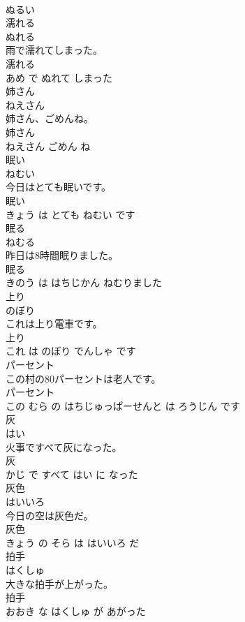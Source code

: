 \documentclass[8pt]{extreport}
\begin{document}
\begin{CJK}{UTF8}{min}
\\	ぬるい	
\\	濡れる	
\\	ぬれる			
\\	雨で濡れてしまった。	
\\	濡れる 
\\	あめ で ぬれて しまった			
\\	姉さん	
\\	ねえさん			
\\	姉さん、ごめんね。	
\\	姉さん 
\\	ねえさん ごめん ね			
\\	眠い	
\\	ねむい			
\\	今日はとても眠いです。	
\\	眠い 
\\	きょう は とても ねむい です			
\\	眠る	
\\	ねむる			
\\	昨日は8時間眠りました。	
\\	眠る 
\\	きのう は はちじかん ねむりました			
\\	上り	
\\	のぼり			
\\	これは上り電車です。	
\\	上り 
\\	これ は のぼり でんしゃ です			
\\	パーセント	
\\	この村の80パーセントは老人です。	
\\	パーセント 
\\	この むら の はちじゅっぱーせんと は ろうじん です			
\\	灰	
\\	はい			
\\	火事ですべて灰になった。	
\\	灰 
\\	かじ で すべて はい に なった			
\\	灰色	
\\	はいいろ			
\\	今日の空は灰色だ。	
\\	灰色 
\\	きょう の そら は はいいろ だ			
\\	拍手	
\\	はくしゅ			
\\	大きな拍手が上がった。	
\\	拍手 
\\	おおき な はくしゅ が あがった			

\end{CJK}
\end{document}
